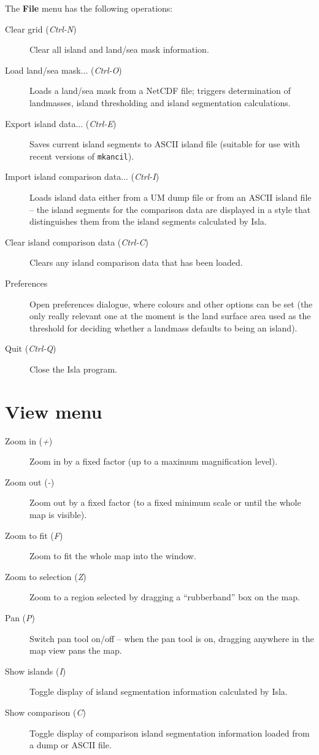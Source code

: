 \documentclass[11pt,makeidx,texhelp]{report}
\begin{document}
The \textbf{File} menu has the following operations:
\begin{description}
  \item[Clear grid (\textit{Ctrl-N})]{Clear all island and land/sea
    mask information.}
  \item[Load land/sea mask... (\textit{Ctrl-O})]{Loads a land/sea mask
    from a NetCDF file; triggers determination of landmasses, island
    thresholding and island segmentation calculations.}
  \item[Export island data... (\textit{Ctrl-E})]{Saves current island
    segments to ASCII island file (suitable for use with recent
    versions of \texttt{mkancil}).}
  \item[Import island comparison data... (\textit{Ctrl-I})]{Loads
    island data either from a UM dump file or from an ASCII island
    file -- the island segments for the comparison data are displayed
    in a style that distinguishes them from the island segments
    calculated by Isla.}
  \item[Clear island comparison data (\textit{Ctrl-C})]{Clears any
    island comparison data that has been loaded.}
  \item[Preferences]{Open preferences dialogue, where colours and
    other options can be set (the only really relevant one at the
    moment is the land surface area used as the threshold for deciding
    whether a landmass defaults to being an island).}
  \item[Quit (\textit{Ctrl-Q})]{Close the Isla program.}
\end{description}

\section{View menu}

\begin{description}
  \item[Zoom in (\textit{+})]{Zoom in by a fixed factor (up to a
    maximum magnification level).}
  \item[Zoom out (\textit{-})]{Zoom out by a fixed factor (to a fixed
    minimum scale or until the whole map is visible).}
  \item[Zoom to fit (\textit{F})]{Zoom to fit the whole map into the
    window.}
  \item[Zoom to selection (\textit{Z})]{Zoom to a region selected by
    dragging a ``rubberband'' box on the map.}
  \item[Pan (\textit{P})]{Switch pan tool on/off -- when the pan tool
    is on, dragging anywhere in the map view pans the map.}
  \item[Show islands (\textit{I})]{Toggle display of island
    segmentation information calculated by Isla.}
  \item[Show comparison (\textit{C})]{Toggle display of comparison
    island segmentation information loaded from a dump or ASCII file.}
\end{description}
\end{document}
